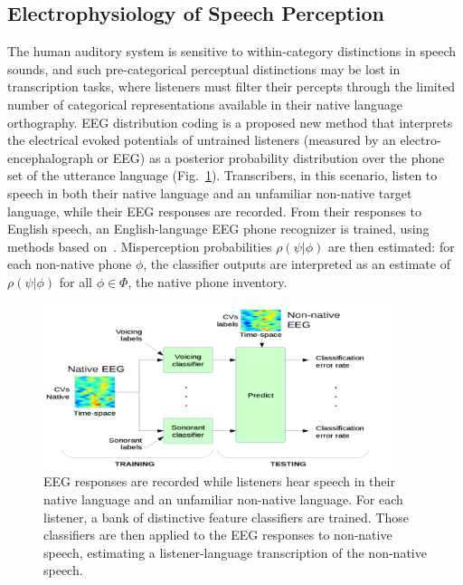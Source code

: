 \subsection{Electrophysiology of Speech Perception}

The human auditory system is sensitive to within-category distinctions 
in speech sounds, and such pre-categorical perceptual distinctions may 
be lost in transcription tasks, where listeners must filter their 
percepts through the limited number of categorical representations 
available in their native language orthography. 
EEG distribution coding is a proposed new method that interprets the
electrical evoked potentials of untrained listeners
(measured by an electro-encephalograph or EEG) as a posterior
probability distribution over the phone set of the utterance language
(Fig.~\ref{fig:eeg_paradigm}).  Transcribers, in this scenario, listen
to speech in both their native language and an unfamiliar non-native
target language, while their EEG responses are
recorded.  From their responses to English speech, an English-language
EEG phone recognizer is trained, using methods based
on~\cite{Liberto15}.  Misperception probabilities $\rho(\psi|\phi)$
are then estimated: for each non-native phone $\phi$, the
classifier outputs are interpreted as an estimate of $\rho(\psi|\phi)$
for all $\phi\in\mathbb{\Phi}$, the native phone inventory.

\begin{figure}
  \centerline{\includegraphics[width=4in]{../figs/diliberto_paradigm.png}}
  \caption{EEG responses are recorded while listeners hear speech in
    their native language and an unfamiliar non-native language.  For 
    each listener, a bank of distinctive feature classifiers are trained. 
    Those classifiers are then applied to the EEG responses to non-native
    speech, estimating a listener-language transcription of the
    non-native speech.}
  \label{fig:eeg_paradigm}
\end{figure}

